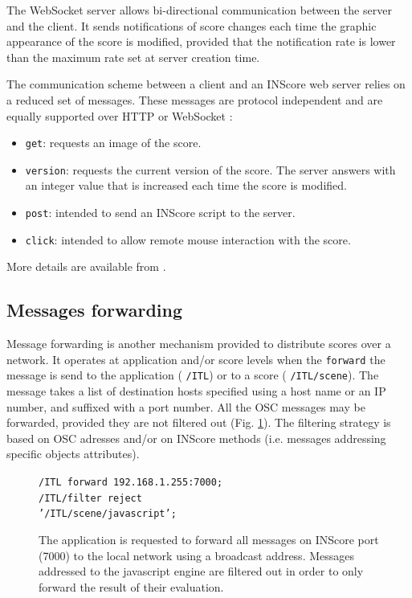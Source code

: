\documentclass[11pt,a4paper]{article}
\newcommand{\OSC}[1]	{{\fontsize{10pt}{10pt} \selectfont\texttt{#1}}}
\newcommand{\tab}		{\hspace*{4mm}}
\newcommand{\dtab}		{\tab \tab}
\newcommand{\sample}[1]	{\vspace{-0.2em}\begin{center}\colorbox{mygrey}{\begin{minipage}[t]{0.98\columnwidth} {\small \texttt{#1}}\end{minipage}}\end{center}}
\begin{document}
The WebSocket server allows bi-directional communication between the server and the client. It sends notifications of score changes each time the graphic appearance of the score is modified, provided that the notification rate is lower than the maximum rate set at server creation time. 

The communication scheme between a client and an INScore web server relies on a reduced set of messages. These messages are protocol independent and are equally supported over HTTP or WebSocket :
\begin{itemize}
\item \OSC{get}: requests an image of the score.
\item \OSC{version}: requests the current version of the score. The server answers with an integer value that is increased each time the score is modified.
\item \OSC{post}: intended to send an INScore script to the server.  
\item \OSC{click}: intended to allow remote mouse interaction with the score.
\end{itemize}

More details are available from \cite{Fober:15b}.


\subsection{Messages forwarding}\label{forward}

Message forwarding is another mechanism provided to distribute scores over a network. It operates at application and/or score levels when the \OSC{forward} the message is send to the application (\OSC{/ITL}) or to a score (\OSC{/ITL/scene}). 
The message takes a list of destination hosts specified using a host name or an IP number, and suffixed with a port number. All the OSC messages may be forwarded, provided they are not filtered out (Fig. \ref{fig:forward}).
The filtering strategy is based on OSC adresses and/or on INScore methods (i.e. messages addressing specific objects attributes). 
\begin{figure}[h]
\begin{center}
\sample{/ITL forward 192.168.1.255:7000; \\
/ITL/filter reject \\
\dtab'/ITL/scene/javascript';
}
\caption{The application is requested to forward all messages on INScore port (7000) to the local network using a broadcast address. Messages addressed to the javascript engine are filtered out in order to only forward the result of their evaluation.}
\label{fig:forward}
\end{center}
\end{figure}
\end{document}
